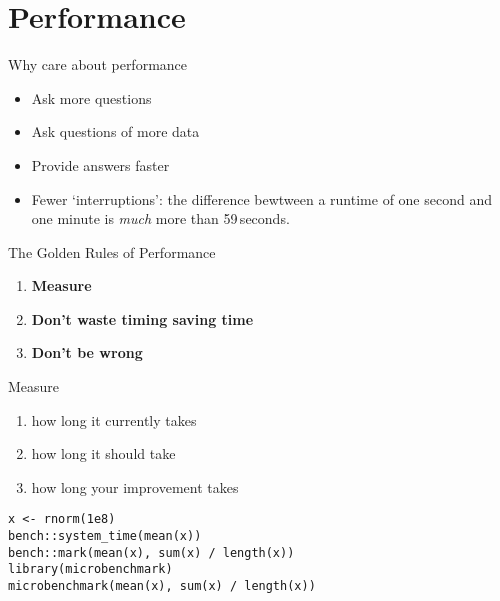 \documentclass{grattan_pres}
\date{2018-08-21}
\begin{document}
\section{Performance}
\maketitle

\begin{frame}{Why care about performance}
	\begin{itemize}
		\item Ask more questions 
		\item Ask questions of more data
		\item Provide answers faster
		\item Fewer `interruptions': the difference bewtween a runtime of one second and one minute is \emph{much} more than 59\,seconds.
	\end{itemize}
\end{frame}

\begin{frame}[t]{The Golden Rules of Performance}

\begin{enumerate}\fontsize{11pt}{25}\selectfont
	\item<1-> \textbf{Measure}%
	\item<3-> \textbf{Don't waste timing saving time}
	\item<4-> \textbf{Don't be wrong}
\end{enumerate}

\end{frame}

\begin{frame}[t,fragile]{Measure}
\null\par

	\begin{enumerate}
		\item how long it currently takes
		\item how long it should take
		\item how long your improvement takes
\end{enumerate}

\begin{lstlisting}[style=Rstyle]
x <- rnorm(1e8)
bench::system_time(mean(x))
bench::mark(mean(x), sum(x) / length(x))
library(microbenchmark)
microbenchmark(mean(x), sum(x) / length(x))
\end{lstlisting}

\end{frame}


\end{document}
